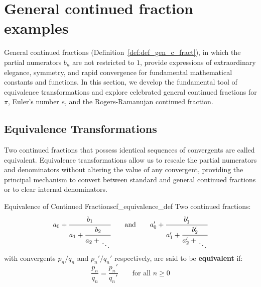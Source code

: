 \documentclass[a4paper]{article}
\begin{document}
\section{General continued fraction examples}\label{cf:sec:general-continued-fraction-examples}
General continued fractions (Definition~\ref{def:def_gen_c_fract}), in which the partial numerators $b_n$ are not restricted to $1$, provide expressions of extraordinary elegance, symmetry, and rapid convergence for fundamental mathematical constants and functions.
In this section, we develop the fundamental tool of equivalence transformations and explore celebrated general continued fractions for $\pi$, Euler's number $e$, and the Rogers-Ramanujan continued fraction.

\subsection{Equivalence Transformations}\label{cf:subsec:equivalence-transformations}
Two continued fractions that possess identical sequences of convergents are called equivalent.
Equivalence transformations allow us to rescale the partial numerators and denominators without altering the value of any convergent, providing the principal mechanism to convert between standard and general continued fractions or to clear internal denominators.

\begin{mydefinition}{Equivalence of Continued Fractions}{cf_equivalence_def}
  Two continued fractions:
  \[
    a_0 + \cfrac{b_1}{a_1 + \cfrac{b_2}{a_2 + \CFDots}} \qquad \text{and} \qquad a_0' + \cfrac{b_1'}{a_1' + \cfrac{b_2'}{a_2' + \CFDots}}
  \]
  with convergents $p_n/q_n$ and $p_n'/q_n'$ respectively, are said to be \textbf{equivalent} if:
  \[
    \frac{p_n}{q_n} = \frac{p_n'}{q_n'} \qquad \text{for all } n \ge 0
  \]
\end{mydefinition}
\end{document}

